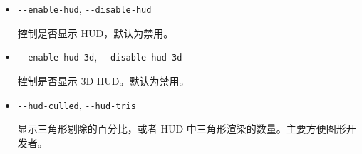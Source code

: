 \begin{itemize}
{\begin{itemize}
  控制是否对（\textbf{H}ead \textbf{U}p  \textbf{D}isplay，平视显示）启用防锯齿。

\item{\texttt{-$ $-enable-hud}, \texttt{-$ $-disable-hud}}

  控制是否显示 HUD，默认为禁用。

\item{\texttt{-$ $-enable-hud-3d}, \texttt{-$ $-disable-hud-3d}}

  控制是否显示 3D HUD。默认为禁用。

 \item{\texttt{-$ $-hud-culled}, \texttt{-$ $-hud-tris}}

  显示三角形剔除的百分比，或者 HUD 中三角形渲染的数量。主要方便图形开发者。 

\end{itemize}
}
\fi

\end{itemize}
